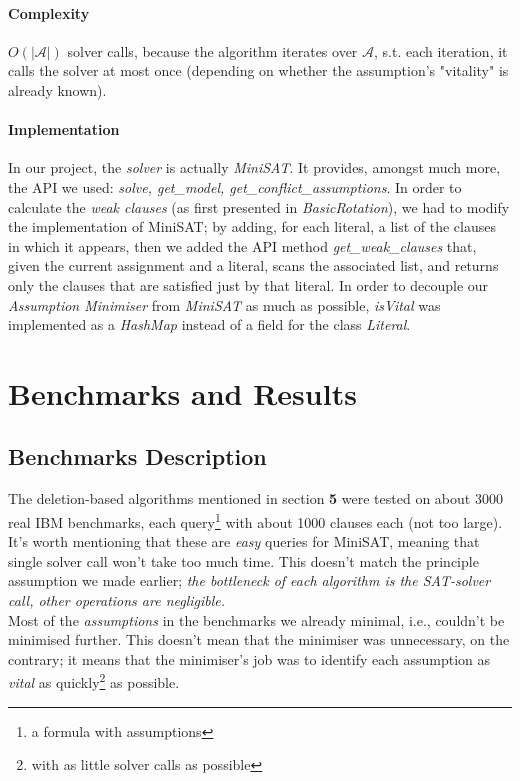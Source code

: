 \documentclass[]{article}
\begin{document}
	\paragraph{Complexity} $ O(|\mathcal{A}|) $ solver calls, because the algorithm iterates over $ \mathcal{A} $, s.t. each iteration, it calls the solver at most once (depending on whether the assumption's "vitality" is already known).

	\paragraph{Implementation} In our project, the \textit{solver} is actually \textit{MiniSAT}. It provides, amongst much more, the API we used: \textit{solve, get\_model, get\_conflict\_assumptions}. In order to calculate the \textit{weak clauses} (as first presented in \textit{BasicRotation}), we had to modify the implementation of MiniSAT; by adding, for each literal, a list of the clauses in which it appears, then we added the API method \textit{get\_weak\_clauses} that, given the current assignment and a literal, scans the associated list, and returns only the clauses that are satisfied just by that literal. In order to decouple our \textit{Assumption Minimiser} from \textit{MiniSAT} as much as possible, \textit{isVital} was implemented as a \textit{HashMap} instead of a field for the class \textit{Literal}.

	\pagebreak
	\section{Benchmarks and Results}
	\subsection{Benchmarks Description}
	The deletion-based algorithms mentioned in section \textbf{5} were tested on about 3000 real IBM benchmarks, each query\footnote{a formula with assumptions} with about 1000 clauses each (not too large). It's worth mentioning that these are \textit{easy} queries for MiniSAT, meaning that single solver call won't take too much time. This doesn't match the principle assumption we made earlier; \textit{the bottleneck of each algorithm is the SAT-solver call, other operations are negligible.} \\
	Most of the \textit{assumptions} in the benchmarks we already minimal, i.e., couldn't be minimised further. This doesn't mean that the minimiser was unnecessary, on the contrary; it means that the minimiser's job was to identify each assumption as \textit{vital} as quickly\footnote{with as little solver calls as possible} as possible.
\end{document}
